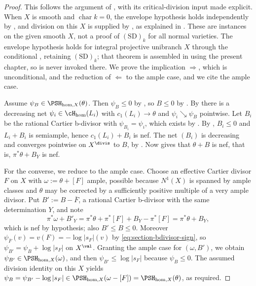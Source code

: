 \begin{proof}
This follows the argument of \cite[Theorem~6.35]{BJ22}, with its
critical-division input made explicit. When $X$ is smooth and
$\operatorname{char}k=0$, the envelope hypothesis holds independently by
\cite[Theorem~A]{BJ22b}, and division on this $X$ is supplied by
\cite[Proposition~17]{BJGreen24}, as explained in
. These are instances on the given smooth
$X$, not a proof of $\mathrm{(SD)}_k$ for all normal varieties. The
envelope hypothesis holds for integral projective unibranch $X$ through the conditional
, retaining $\mathrm{(SD)}_k$; that theorem is assembled in
using the present chapter, so  is never
invoked there.  We prove the implication $\Rightarrow$, which is
unconditional, and the reduction of $\Leftarrow$ to the ample case, and we
cite the ample case.

Assume $\psi_B\in\PSH_{\mathrm{hom},X}(\theta)$.  Then
$\psi_B\leq0$ by , so
$B\leq0$ by .  By
 there is a decreasing net
$\psi_i\in\cH_{\mathrm{hom}}(L_i)$ with
$c_1(L_i)\to\theta$ and $\psi_i\searrow\psi_B$ pointwise.  Let
$B_i$ be the rational Cartier b-divisor with $\psi_{B_i}=\psi_i$, which
exists by .  By
, $B_i\leq0$ and
$L_i+B_i$ is semiample, hence $c_1(L_i)+B_i$ is nef.  The net
$(B_i)$ is decreasing and converges pointwise on $X^{\divis}$ to
$B$, by .  Now
 gives that $\theta+B$ is nef, that is,
$\pi^*\theta+B_Y$ is nef.

For the converse, we reduce to the ample case.  Choose an effective Cartier
divisor $F$ on $X$ with $\omega:=\theta+[F]$ ample, possible because
$N^1(X)$ is spanned by ample classes and $\theta$ may be corrected by a
sufficiently positive multiple of a very ample divisor.  Put
$B':=B-\overline F$, a rational Cartier b-divisor with the same
determination $Y$, and note
\[
 \pi^*\omega+B'_Y=\pi^*\theta+\pi^*[F]+B_Y-\pi^*[F]=\pi^*\theta+B_Y,
\]
which is nef by hypothesis; also $B'\leq B\leq0$.  Moreover
$\psi_{\overline F}(v)=v(F)=-\log|s_F|(v)$ by
\eqref{eq:section-bdivisor-sign}, so
$\psi_{B'}=\psi_B+\log|s_F|$ on $X^{\val}$.  Granting the ample case for
$(\omega,B')$, we obtain
$\psi_{B'}\in\PSH_{\mathrm{hom},X}(\omega)$, and then
$\psi_{B'}\leq\log|s_F|$ because $\psi_B\leq0$.
The assumed division identity on this $X$ yields
$\psi_B=\psi_{B'}-\log|s_F|\in\PSH_{\mathrm{hom},X}(\omega-[F])
=\PSH_{\mathrm{hom},X}(\theta)$, as required.


\end{proof}
